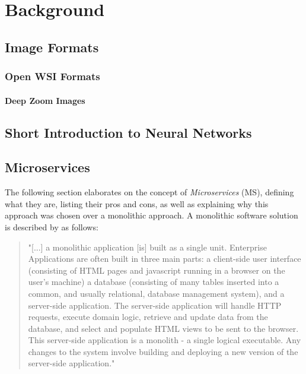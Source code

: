 \chapter{Background}
\section{Image Formats}
\subsection{Open WSI Formats}
\subsubsection{Deep Zoom Images}
\section{Short Introduction to Neural Networks}




\section{Microservices}
The following section elaborates on the concept of \emph{Microservices} (MS), defining what they are, listing their pros and cons, as well as explaining why this approach was chosen over a monolithic approach. A monolithic software solution is described by \cite{Lewis14} as follows:
\begin{quotation}
	"[...] a monolithic application [is] built as a single unit. Enterprise Applications are often built in three main parts: a client-side user interface (consisting of HTML pages and javascript running in a browser on the user's machine) a database (consisting of many tables inserted into a common, and usually relational, database management system), and a server-side application. The server-side application will handle HTTP requests, execute domain logic, retrieve and update data from the database, and select and populate HTML views to be sent to the browser. This server-side application is a monolith - a single logical executable. Any changes to the system involve building and deploying a new version of the server-side application."
\end{quotation}



